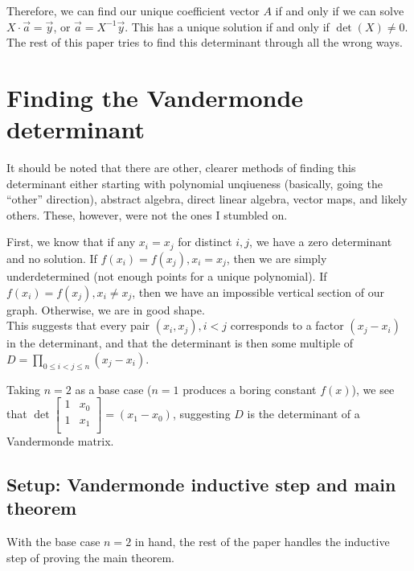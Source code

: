 \documentclass[11pt, oneside]{article} 	%
\begin{document}
Therefore, we can find our unique coefficient vector $A$ if and only if we can solve $X \cdot \vec{a} = \vec{y}$, or $\vec{a} = X^{-1} \vec{y}$.  This has a unique solution if and only if $\det(X) \neq 0$.  The rest of this paper tries to find this determinant through all the wrong ways.

\section{Finding the Vandermonde determinant}

It should be noted that there are other, clearer methods of finding this determinant\cite{1} either starting with polynomial unqiueness (basically, going the ``other'' direction), abstract algebra, direct linear algebra, vector maps, and likely others.  These, however, were not the ones I stumbled on.

First, we know that if any $x_i = x_j$ for distinct $i, j$, we have a zero determinant and no solution. If $f(x_i) = f(x_j), x_i = x_j$, then we are simply underdetermined (not enough points for a unique polynomial).   If $f(x_i) = f(x_j), x_i \neq x_j$, then we have an impossible vertical section of our graph.  Otherwise, we are in good shape.  
\\

This suggests that every pair $(x_i, x_j), i < j$ corresponds to a factor  $(x_j - x_i)$ in the determinant, and that the determinant is then some multiple of $D = \prod_{0 \leq i < j \leq n}(x_j-x_i)$.

Taking $n=2$ as a base case ($n=1$ produces a boring constant $f(x)$), we see that 
 $\det\begin{bmatrix}
1 & x_0  \\
1 & x_1  \\
\end{bmatrix} = (x_1 - x_0)$, suggesting $D$ is the determinant of a Vandermonde matrix.  

\subsection{Setup: Vandermonde inductive step and main theorem}


With the base case $n=2$ in hand, the rest of the paper handles the inductive step of proving the main theorem.
\end{document}
